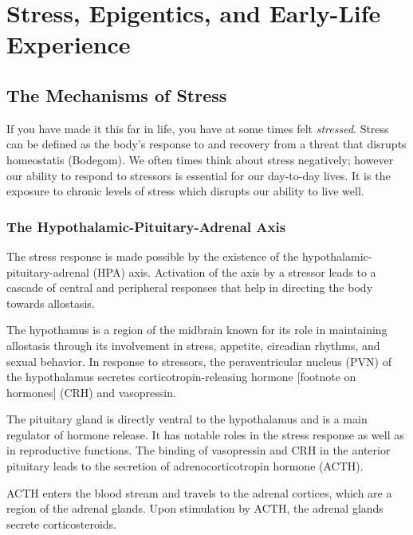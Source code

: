 \documentclass[12pt,twoside]{reedthesis}
\begin{document}

\chapter{Stress, Epigentics, and Early-Life Experience}

\section{The Mechanisms of Stress}
If you have made it this far in life, you have at some times felt
\textit{stressed}. Stress can be
defined as the body's response to and recovery from a threat that disrupts
homeostatis (Bodegom). We often times think about stress negatively; however our
ability to respond to stressors is essential for our day-to-day lives. It is the
exposure to chronic levels of stress which disrupts our ability to live well.

\subsection{The Hypothalamic-Pituitary-Adrenal Axis}
 The
stress response is made possible by the existence of the hypothalamic-pituitary-adrenal (HPA)
axis. Activation of the axis by a stressor leads to a cascade of central and
peripheral responses that help in directing the body towards allostasis.

The hypothamus is a region of the midbrain known
for its role in maintaining allostasis through its involvement in stress,
appetite, circadian rhythms, and sexual behavior. In response to stressors, the
peraventricular nucleus (PVN) of the hypothalamus secretes
corticotropin-releasing hormone [footnote on hormones] (CRH) and vasopressin.

The pituitary gland is directly ventral to the hypothalamus and is a main
regulator of hormone release. It has notable roles in the stress response as
well as in reproductive functions. The binding of vasopressin and CRH in the
anterior pituitary leads to the secretion of adrenocorticotropin hormone (ACTH).

ACTH enters the blood stream and travels to the adrenal cortices, which are a
region of the adrenal glands. Upon stimulation by ACTH, the adrenal glands
secrete corticosteroids. 
\end{document}
